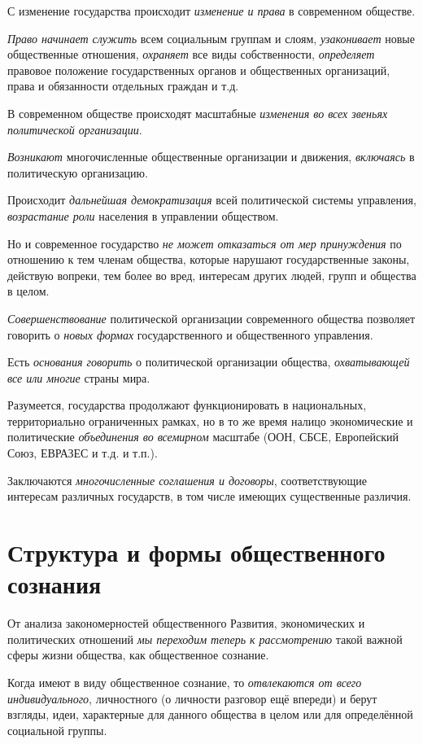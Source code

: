 \documentclass[a4paper,14pt,russian]{extreport}
\begin{document}
С изменение государства происходит \emph{изменение и права} в современном обществе.

\emph{Право начинает служить} всем социальным группам и слоям, \emph{узаконивает} новые общественные отношения, \emph{охраняет} все виды собственности, \emph{определяет} правовое положение государственных органов и общественных организаций, права и обязанности отдельных граждан и т.д.

В современном обществе происходят масштабные \emph{изменения во всех звеньях политической организации}.

\emph{Возникают} многочисленные общественные организации и движения, \emph{включаясь} в политическую организацию.

Происходит \emph{дальнейшая демократизация} всей политической системы управления, \emph{возрастание роли} населения в управлении обществом.

Но и современное государство \emph{не может отказаться от мер принуждения} по отношению к тем членам общества, которые нарушают государственные законы, действую вопреки, тем более во вред, интересам других людей, групп и общества в целом.

\emph{Совершенствование} политической организации современного общества позволяет говорить о \emph{новых формах} государственного и общественного управления.

Есть \emph{основания говорить} о политической организации общества, \emph{охватывающей все или многие} страны мира.

Разумеется, государства продолжают функционировать в национальных, территориально ограниченных рамках, но в то же время налицо экономические и политические \emph{объединения во всемирном} масштабе (ООН, СБСЕ, Европейский Союз, ЕВРАЗЕС и т.д. и т.п.).

Заключаются \emph{многочисленные соглашения и договоры}, соответствующие интересам различных государств, в том числе имеющих существенные различия.

\section{Структура и формы общественного сознания}

От анализа закономерностей общественного Развития, экономических и политических отношений \emph{мы переходим теперь к рассмотрению} такой важной сферы жизни общества, как общественное сознание.

Когда имеют в виду общественное сознание, то \emph{отвлекаются от всего индивидуального}, личностного (о личности разговор ещё впереди) и берут взгляды, идеи, характерные для данного общества в целом или для определённой социальной группы.
\end{document}
